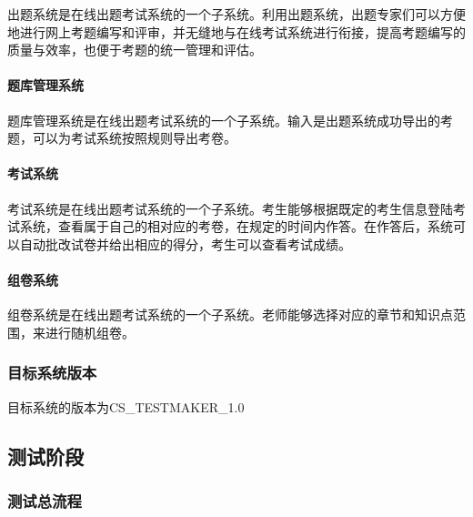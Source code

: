 \documentclass[hyperref, a4paper]{ctexart}
\let\oldparagraph\paragraph
\renewcommand{\paragraph}[1]{\oldparagraph{#1}\mbox{}}
\begin{document}
出题系统是在线出题考试系统的一个子系统。利用出题系统，出题专家们可以方便地进行网上考题编写和评审，并无缝地与在线考试系统进行衔接，提高考题编写的质量与效率，也便于考题的统一管理和评估。

\hypertarget{ux9898ux5e93ux7ba1ux7406ux7cfbux7edf}{%
\paragraph{题库管理系统}\label{ux9898ux5e93ux7ba1ux7406ux7cfbux7edf}}

题库管理系统是在线出题考试系统的一个子系统。输入是出题系统成功导出的考题，可以为考试系统按照规则导出考卷。

\hypertarget{ux8003ux8bd5ux7cfbux7edf}{%
\paragraph{考试系统}\label{ux8003ux8bd5ux7cfbux7edf}}

考试系统是在线出题考试系统的一个子系统。考生能够根据既定的考生信息登陆考试系统，查看属于自己的相对应的考卷，在规定的时间内作答。在作答后，系统可以自动批改试卷并给出相应的得分，考生可以查看考试成绩。

\hypertarget{ux7ec4ux5377ux7cfbux7edf}{%
\paragraph{组卷系统}\label{ux7ec4ux5377ux7cfbux7edf}}

组卷系统是在线出题考试系统的一个子系统。老师能够选择对应的章节和知识点范围，来进行随机组卷。

\hypertarget{ux76eeux6807ux7cfbux7edfux7248ux672c}{%
\subsubsection{目标系统版本}\label{ux76eeux6807ux7cfbux7edfux7248ux672c}}

目标系统的版本为CS\_TESTMAKER\_1.0

\hypertarget{ux6d4bux8bd5ux9636ux6bb5}{%
\subsection{测试阶段}\label{ux6d4bux8bd5ux9636ux6bb5}}

\hypertarget{ux6d4bux8bd5ux603bux6d41ux7a0b}{%
\subsubsection{测试总流程}\label{ux6d4bux8bd5ux603bux6d41ux7a0b}}
\end{document}
